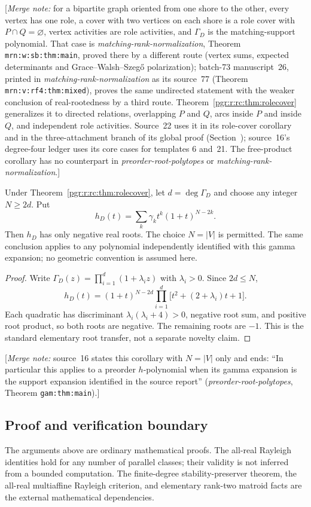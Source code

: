 \documentclass[11pt]{article}
\makeatletter
\numberwithin{equation}{section}
\theoremstyle{definition}\newtheorem{definition}[theorem]{Definition}\newtheorem{remark}[theorem]{Remark}
\newcommand{\Ga}{\Gamma}                   %
\newcommand{\mnote}[1]{[\textit{Merge note:} #1]}
\newcommand{\prp}{\emph{preorder-root-polytopes}}
\newcommand{\mrn}{\emph{matching-rank-normalization}}
\newcommand{\pgrfwd}[2]{\@ifundefined{r@#1}{#2}{\ref{#1}}}
\makeatother
\begin{document}
\mnote{for a bipartite graph oriented from one shore to the other, every
vertex has one role, a cover with two vertices on each shore is a role
cover with $P\cap Q=\varnothing$, vertex activities are role activities,
and $\Ga_D$ is the matching-support polynomial. That case is \mrn,
Theorem \texttt{mrn:w:sb:thm:main}, proved there by a different route
(vertex sums, expected determinants and Grace--Walsh--Szeg\H{o}
polarization); batch-73 manuscript~26, printed in \mrn{} as its source~77
(Theorem \texttt{mrn:v:rf4:thm:mixed}), proves the same undirected
statement with the weaker conclusion of real-rootedness by a third route. Theorem~\ref{pgr:r:rc:thm:rolecover} generalizes it to
directed relations, overlapping $P$ and $Q$, arcs inside $P$ and inside
$Q$, and independent role activities. Source~22 uses it in its role-cover
corollary and in the three-attachment branch of its global proof
(Section~\pgrfwd{pgr:r:ir:sec}{on source~22}); source~16's degree-four ledger
uses its core cases for templates 6 and~21. The free-product corollary has
no counterpart in \prp{} or \mrn.}


\begin{corollary}\label{pgr:r:rc:cor:transfer}
Under Theorem~\ref{pgr:r:rc:thm:rolecover}, let $d=\deg\Ga_D$ and choose any integer $N\ge2d$. Put
\[
 h_D(t)=\sum_k\gamma_k t^k(1+t)^{N-2k}.
\]
Then $h_D$ has only negative real roots. The choice $N=|V|$ is permitted. The same conclusion applies to any polynomial independently identified with this gamma expansion; no geometric convention is assumed here.
\end{corollary}
\begin{proof}
Write $\Ga_D(z)=\prod_{i=1}^d(1+\lambda_i z)$ with $\lambda_i>0$. Since $2d\le N$,
\[
 h_D(t)=(1+t)^{N-2d}\prod_{i=1}^d\bigl[t^2+(2+\lambda_i)t+1\bigr].
\]
Each quadratic has discriminant $\lambda_i(\lambda_i+4)>0$, negative root sum, and positive root product, so both roots are negative. The remaining roots are $-1$. This is the standard elementary root transfer, not a separate novelty claim.
\end{proof}

\mnote{source~16 states this corollary with $N=|V|$ only and ends: ``In
particular this applies to a preorder $h$-polynomial when its gamma
expansion is the support expansion identified in the source report''
(\prp, Theorem \texttt{gam:thm:main}).}


\subsection{Proof and verification boundary}
The arguments above are ordinary mathematical proofs. The all-real Rayleigh identities hold for any number of parallel classes; their validity is not inferred from a bounded computation. The finite-degree stability-preserver theorem, the all-real multiaffine Rayleigh criterion, and elementary rank-two matroid facts are the external mathematical dependencies.
\end{document}

